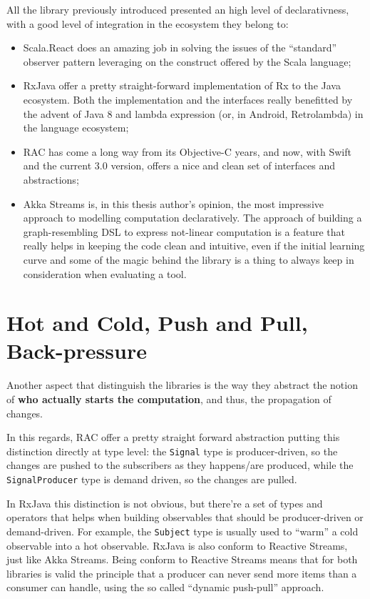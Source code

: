 All the library previously introduced presented an high level of
declarativness, with a good level of integration in the ecosystem they
belong to:

\begin{itemize}
\itemsep1pt\parskip0pt
\item
  Scala.React does an amazing job in solving the issues of the
  ``standard'' observer pattern leveraging on the construct offered by
  the Scala language;
\item
  RxJava offer a pretty straight-forward implementation of Rx to the Java
  ecosystem. Both the implementation and the interfaces really
  benefitted by the advent of Java 8 and lambda expression (or, in
  Android, Retrolambda) in the language ecosystem;
\item
  RAC has come a long way from its Objective-C years, and now, with
  Swift and the current 3.0 version, offers a nice and clean set of
  interfaces and abstractions;
\item
  Akka Streams is, in this thesis author's opinion, the most impressive
  approach to modelling computation declaratively. The approach of
  building a graph-resembling DSL to express not-linear computation is a
  feature that really helps in keeping the code clean and intuitive,
  even if the initial learning curve and some of the magic behind the
  library is a thing to always keep in consideration when evaluating a
  tool.
\end{itemize}

\section{Hot and Cold, Push and Pull,
Back-pressure}\label{hot-and-cold-push-and-pull-back-pressure}

Another aspect that distinguish the libraries is the way they abstract
the notion of \textbf{who actually starts the computation}, and thus,
the propagation of changes.

In this regards, RAC offer a pretty straight forward abstraction putting
this distinction directly at type level: the \texttt{Signal} type is
producer-driven, so the changes are pushed to the subscribers as they
happens/are produced, while the \texttt{SignalProducer} type is demand
driven, so the changes are pulled.

In RxJava this distinction is not obvious, but there're a set of types
and operators that helps when building observables that should be
producer-driven or demand-driven. For example, the \texttt{Subject} type
is usually used to ``warm'' a cold observable into a hot observable.
RxJava is also conform to Reactive Streams, just like Akka Streams.
Being conform to Reactive Streams means that for both libraries is valid
the principle that a producer can never send more items than a consumer
can handle, using the so called ``dynamic push-pull'' approach.

